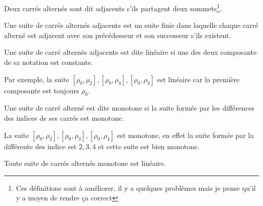 \begin{definition}
  Deux carrés alternés sont dit adjacents s'ils partagent deux sommets\footnote{Ces définitions sont à améliorer, il y a quelques problèmes mais je pense qu'il y a moyen de rendre ça correct}.
\end{definition}

\begin{definition}
  Une suite de carrés alternés adjacents est un suite finie dans laquelle chaque carré alterné est adjacent avec son précédesseur et son successeur s'ils existent.
\end{definition}

\begin{definition}
  Une suite de carré alternés adjacents est dite linéaire si une des deux composante de sa notation est constante.
\end{definition}

Par exemple, la suite $[\rho_0, \rho_2], [\rho_0, \rho_4], [\rho_0, \rho_3]$ est linéaire car la première composante est toujours $\rho_0$.

\begin{definition}
  Une suite de carré alterné est dite monotone si la suite formée par les différences des indices de ses carrés est monotone.
\end{definition}

La suite $[\rho_0, \rho_2], [\rho_0, \rho_3], [\rho_0, \rho_4]$ est monotone, en effet la suite formée par la différente des indice est $2, 3, 4$ et cette suite est bien monotone.

\begin{proposition}
  Toute suite de carrés alternés monotone est linéaire.
\end{proposition}


